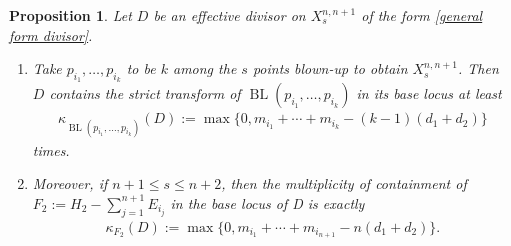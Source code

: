 \documentclass[a4paper,11pt]{article}
\newtheorem{proposition}[theorem]{Proposition}
\newcommand{\BL}{\operatorname{BL}}
\newcommand{\ourproductblowup}[1]{X^{n,n+1}_{#1}}
\begin{document}
\begin{proposition}\label{BLI for bilinear spans} Let $D$ be an effective divisor on $\ourproductblowup{s}$ of the form 
\eqref{general form divisor}.
\begin{enumerate}
    \item[(a)]
Take $p_{i_1},\dots,p_{i_k}$ to be $k$ among the $s$ points blown-up to obtain $\ourproductblowup{s}$. Then $D$ contains the strict transform of $\BL(p_{i_1},\dots,p_{i_k})$ in its base locus at least
\begin{align*}
\kappa_{\BL(p_{i_1},\dots,p_{i_k})}(D):=\max\{0,m_{i_1}+\cdots+m_{i_k}-(k-1)(d_1+d_2)\}
\end{align*}
times.
 \item[(b)]
Moreover, if $n+1\le s\le n+2$, then the 
 multiplicity of containment of $F_2:=H_2-\sum_{j=1}^{n+1}E_{i_j}$ in the base locus of D is exactly
 \begin{align*}
    \kappa_{F_2}(D):=\max\{0,m_{i_1}+\cdots+m_{i_{n+1}}-n(d_1+d_2)\}.
\end{align*}
\end{enumerate}
\end{proposition}
\end{document}
